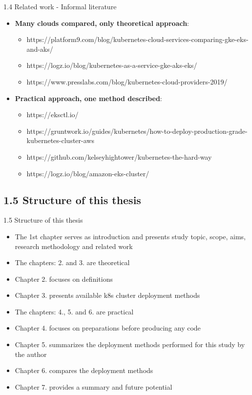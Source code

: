 \documentclass{beamer}
\begin{document}
\begin{frame}{1.4 Related work - Informal literature}%
\begin{itemize}
	\item \textbf{Many clouds compared, only theoretical approach}:
	\begin{itemize}
		\item https://platform9.com/blog/kubernetes-cloud-services-comparing-gke-eks-and-aks/
		\item https://logz.io/blog/kubernetes-as-a-service-gke-aks-eks/
		\item https://www.presslabs.com/blog/kubernetes-cloud-providers-2019/
	\end{itemize}
	\item \textbf{Practical approach, one method described}:
	\begin{itemize}
		\item https://eksctl.io/
		\item https://gruntwork.io/guides/kubernetes/how-to-deploy-production-grade-kubernetes-cluster-aws
		\item https://github.com/kelseyhightower/kubernetes-the-hard-way
		\item https://logz.io/blog/amazon-eks-cluster/
	\end{itemize}
\end{itemize}
\end{frame}

\subsection{1.5 Structure of this thesis}
\begin{frame}{1.5 Structure of this thesis}%
\begin{itemize}
	\item The 1st chapter serves as introduction and presents study topic, scope, aims, research methodology and related work  
	\item The chapters: 2. and 3. are theoretical 
	\item Chapter 2. focuses on definitions 
	\item Chapter 3. presents available k8s cluster deployment methods
	\item The chapters: 4., 5. and 6. are practical 
	\item Chapter 4. focuses on preparations before producing any code 
	\item Chapter 5. summarizes the deployment methods performed for this study by the author
	\item Chapter 6. compares the deployment methods 
	\item Chapter 7. provides a summary and future potential
\end{itemize}
\end{frame}
\end{document}
